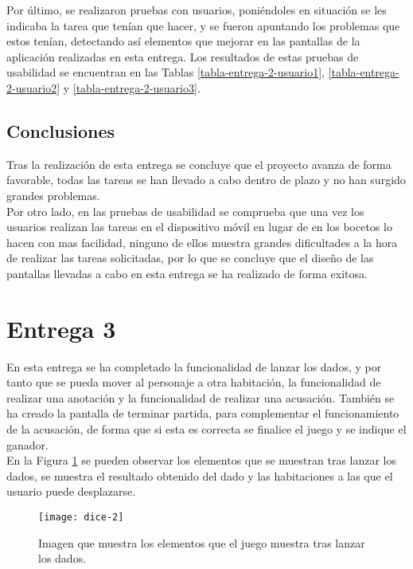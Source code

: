 Por último, se realizaron pruebas con usuarios, poniéndoles en situación se les indicaba la tarea que tenían que hacer, y se fueron apuntando los problemas que estos tenían, detectando así elementos que mejorar en las pantallas de la aplicación realizadas en esta entrega. Los resultados de estas pruebas de usabilidad se encuentran en las Tablas \ref{tabla-entrega-2-usuario1}, \ref{tabla-entrega-2-usuario2} y \ref{tabla-entrega-2-usuario3}.

\subsection{Conclusiones}
Tras la realización de esta entrega se concluye que el proyecto avanza de forma favorable, todas las tareas se han llevado a cabo dentro de plazo y no han surgido grandes problemas.\\

Por otro lado, en las pruebas de usabilidad se comprueba que una vez los usuarios realizan las tareas en el dispositivo móvil en lugar de en los bocetos lo hacen con mas facilidad, ninguno de ellos muestra grandes dificultades a la hora de realizar las tareas solicitadas, por lo que se concluye que el diseño de las pantallas llevadas a cabo en esta entrega se ha realizado de forma exitosa.

\section{Entrega 3}
En esta entrega se ha completado la funcionalidad de lanzar los dados, y por tanto que se pueda mover al personaje a otra habitación, la funcionalidad de realizar una anotación y la funcionalidad de realizar una acusación. También se ha creado la pantalla de terminar partida, para complementar el funcionamiento de la acusación, de forma que si esta es correcta se finalice el juego y se indique el ganador.\\

En la Figura \ref{figura-dado-1} se pueden observar los elementos que se muestran tras lanzar los dados, se muestra el resultado obtenido del dado y las habitaciones a las que el usuario puede desplazarse.

\begin{figure}[h]
  \centering
  \texttt{[image: dice-2]}
  \caption{Imagen que muestra los elementos que el juego muestra tras lanzar los dados.}
  \label{figura-dado-1}
\end{figure}

